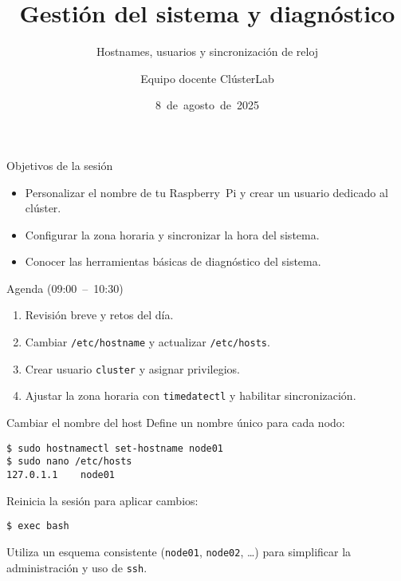 \documentclass[aspectratio=169,professionalfonts]{beamer}
\title[ClústerLab • Día 3]{Gestión del sistema y diagnóstico}
\subtitle{Hostnames, usuarios y sincronización de reloj}
\author{Equipo docente ClústerLab}
\date{8 de agosto de 2025}
\begin{document}
\begin{frame}[plain]
  \titlepage
\end{frame}

\begin{frame}[fragile]{Objetivos de la sesión}
  \begin{itemize}
    \item Personalizar el nombre de tu Raspberry Pi y crear un usuario dedicado al clúster.
    \item Configurar la zona horaria y sincronizar la hora del sistema.
    \item Conocer las herramientas básicas de diagnóstico del sistema.
  \end{itemize}
\end{frame}

\begin{frame}[fragile]{Agenda (09:00 – 10:30)}
  \begin{enumerate}
    \item Revisión breve y retos del día.
    \item Cambiar \texttt{/etc/hostname} y actualizar \texttt{/etc/hosts}.
    \item Crear usuario \texttt{cluster} y asignar privilegios.
    \item Ajustar la zona horaria con \texttt{timedatectl} y habilitar sincronización.
  \end{enumerate}
\end{frame}

\begin{frame}[fragile]{Cambiar el nombre del host}
  Define un nombre único para cada nodo:
  \begin{verbatim}
$ sudo hostnamectl set-hostname node01
$ sudo nano /etc/hosts
127.0.1.1    node01
  \end{verbatim}
  Reinicia la sesión para aplicar cambios:
  \begin{verbatim}
$ exec bash
  \end{verbatim}
  \begin{infobox}
  Utiliza un esquema consistente (\texttt{node01}, \texttt{node02}, …) para simplificar la administración y uso de \texttt{ssh}.
  \end{infobox}
\end{frame}
\end{document}
